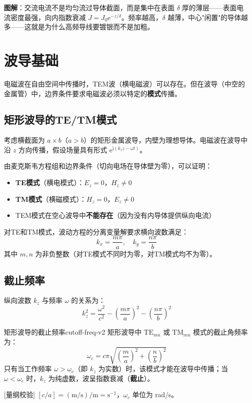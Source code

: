 \documentclass[11pt,a4paper,openany,oneside]{book}
\newcommand{\ii}{\mathrm{i}}
\newcommand{\ee}{\mathrm{e}}
\begin{document}
\textbf{图解}：交流电流不是均匀流过导体截面，而是集中在表面 $\delta$ 厚的薄层——表面电流密度最强，向内指数衰减 $J = J_0\ee^{-z/\delta}$。频率越高，$\delta$ 越薄，中心"闲置"的导体越多——这就是为什么高频导线要镀银而不是加粗。

\section{波导基础}

电磁波在自由空间中传播时，TEM波（横电磁波）可以存在。但在波导（中空的金属管）中，边界条件要求电磁波必须以特定的\textbf{模式}传播。

\subsection{矩形波导的TE/TM模式}

考虑横截面为 $a \times b$（$a > b$）的矩形金属波导，内壁为理想导体。电磁波在波导中沿 $z$ 方向传播，假设场量具有形式 $\ee^{\ii(k_z z - \omega t)}$。

由麦克斯韦方程组和边界条件（切向电场在导体壁为零），可以证明：
\begin{itemize}
\item \textbf{TE模式}（横电模式）：$E_z = 0$，$H_z \neq 0$
\item \textbf{TM模式}（横磁模式）：$H_z = 0$，$E_z \neq 0$
\item TEM模式在空心波导中\textbf{不能存在}（因为没有内导体提供纵向电流）
\end{itemize}

对TE和TM模式，波动方程的分离变量解要求横向波数满足：
\[
k_x = \frac{m\pi}{a}, \quad k_y = \frac{n\pi}{b}
\]
其中 $m, n$ 为非负整数（对TE模式不同时为零，对TM模式均不为零）。

\subsection{截止频率}

纵向波数 $k_z$ 与频率 $\omega$ 的关系为：
\[
k_z^2 = \frac{\omega^2}{c^2} - \left(\frac{m\pi}{a}\right)^2 - \left(\frac{n\pi}{b}\right)^2
\]

\begin{theorem}{矩形波导的截止频率}{cutoff-freq-v2}
矩形波导中 $\text{TE}_{mn}$ 或 $\text{TM}_{mn}$ 模式的截止角频率为：
\[
\omega_c = c\pi\sqrt{\left(\frac{m}{a}\right)^2 + \left(\frac{n}{b}\right)^2}
\]
只有当工作频率 $\omega > \omega_c$（即 $k_z$ 为实数）时，该模式才能在波导中传播；当 $\omega < \omega_c$ 时，$k_z$ 为纯虚数，波呈指数衰减（\textbf{截止}）。

[量纲校验] $[c/a] = (\mathrm{m/s})/\mathrm{m} = \mathrm{s}^{-1}$，$\omega_c$ 单位为 \si{rad/s}。\checkmark
\end{theorem}
\end{document}
